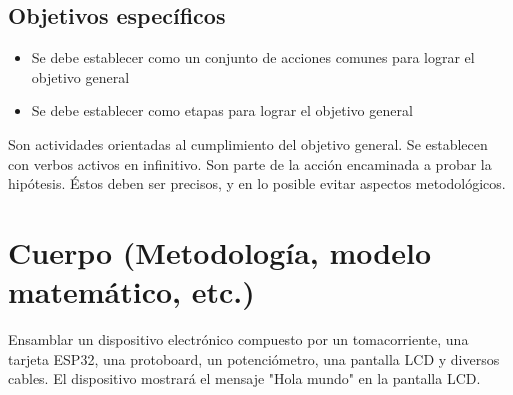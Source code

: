     \subsection{Objetivos específicos }
    
    \begin{itemize}
        \item Se debe establecer como un conjunto de acciones comunes para lograr el objetivo general
        \item Se debe establecer como etapas para lograr el objetivo general
    \end{itemize}
    
    Son actividades orientadas al cumplimiento del objetivo general. Se establecen con verbos activos en infinitivo. Son parte de la acción encaminada a probar la hipótesis. Éstos deben ser precisos, y en lo posible evitar aspectos metodológicos.
    \section{Cuerpo (Metodología, modelo matemático, etc.)}
    
    Ensamblar un dispositivo electrónico compuesto por un tomacorriente, una tarjeta ESP32, una protoboard, un potenciómetro, una pantalla LCD y diversos cables. El dispositivo mostrará el mensaje "Hola mundo" en la pantalla LCD.
    
